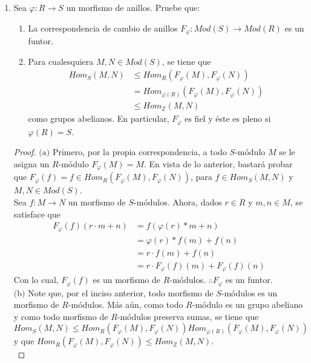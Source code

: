 \documentclass{article}
\newcommand{\lrprth}[1]{
	\left(#1\right)
}
\newcommand{\ringmodhom}[3]{
	Hom_{#1}\lrprth{#2,#3}
}
\theoremstyle{definition}
\theoremstyle{plain}
\theoremstyle{plain}
\theoremstyle{definition}
\theoremstyle{definition}
\theoremstyle{definition}
\theoremstyle{definition}
\theoremstyle{definition}
\theoremstyle{definition}
\begin{document}
\begin{enumerate}[label=\textbf{Ej \arabic*.}]
\item Sea $\varphi : R \longrightarrow S$ un morfismo de anillos. Pruebe que:
\begin{enumerate}
	\item La correspondencia de cambio de anillos $F_{\varphi} : Mod\lrprth{S} \longrightarrow Mod\lrprth{R}$ es un funtor.
	\item Para cualesquiera $M,N \in Mod\lrprth{S}$, se tiene que
	\begin{align*}
		\ringmodhom{S}{M}{N} &\leq \ringmodhom{R}{F_{\varphi}\lrprth{M}}{F_{\varphi}\lrprth{N}}\\
		&= \ringmodhom{\varphi \lrprth{R}}{F_{\varphi}\lrprth{M}}{F_{\varphi}\lrprth{N}}\\
		&\leq \ringmodhom{\mathbb{Z}}{M}{N}
	\end{align*}
	como grupos abelianos. En particular, $F_{\varphi}$ es fiel y éste es pleno si $\varphi \lrprth{R}=S$.
\end{enumerate}
\begin{proof}
	$\boxed{\text{(a)}}$ Primero, por la propia correspondencia, a todo $S$-módulo $M$ se le asigna un $R$-módulo $F_{\varphi} \lrprth{M}=M$. En vista de lo anterior, bastará probar que $F_{\varphi}\lrprth{f} = f \in \ringmodhom{R}{F_{\varphi}\lrprth{M}}{F_{\varphi}\lrprth{N}}$, para $f \in \ringmodhom{S}{M}{N}$ y $M,N \in Mod\lrprth{S}$.\\
	
	Sea $f:M \longrightarrow N$ un morfismo de $S$-módulos. Ahora, dados $r \in R$ y $m,n \in M$, se satisface que
	\begin{align*}
		F_{\varphi}\lrprth{f}\lrprth{r \cdot m + n}&=f\lrprth{\varphi\lrprth{r}*m+n}\\
		&=\varphi \lrprth{r}*f\lrprth{m}+f\lrprth{n}\\
		&=r \cdot f\lrprth{m}+f\lrprth{n}\\
		&=r \cdot F_{\varphi} \lrprth{f}\lrprth{m}+F_{\varphi} \lrprth{f}\lrprth{n}
	\end{align*}
	Con lo cual, $F_{\varphi} \lrprth{f}$ es un morfismo de $R$-módulos. $\therefore F_{\varphi}$ es un funtor.\\
	
	$\boxed{\text{(b)}}$ Note que, por el inciso anterior, todo morfismo de $S$-módulos es un morfismo de $R$-módulos. Más aún, como todo $R$-módulo es un grupo abeliano y como todo morfismo de $R$-módulos preserva sumas, se tiene que $\ringmodhom{S}{M}{N}\leq\ringmodhom{R}{F_{\varphi}\lrprth{M}}{F_{\varphi}\lrprth{N}}\ringmodhom{\varphi \lrprth{R}}{F_{\varphi}\lrprth{M}}{F_{\varphi}\lrprth{N}}$ y que $\ringmodhom{R}{F_{\varphi}\lrprth{M}}{F_{\varphi}\lrprth{N}} \leq \ringmodhom{\mathbb{Z}}{M}{N}$.\\
	

\end{proof}
\end{enumerate}
\end{document}
